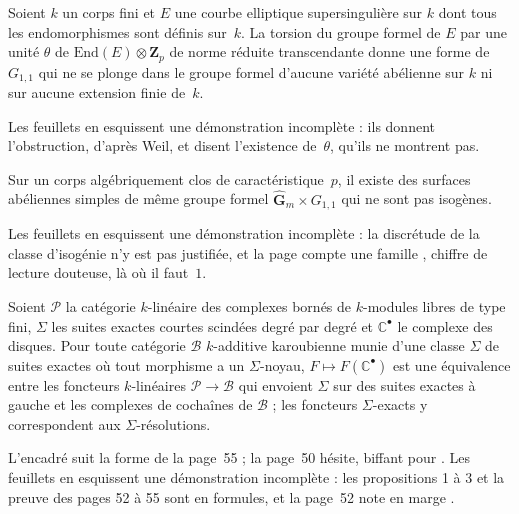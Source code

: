 \begin{encadre}
\begin{theoreme*}\nonverifie
Soient $k$ un corps fini et $E$ une courbe elliptique supersingulière sur $k$ dont tous les endomorphismes sont définis sur~$k$. La torsion du groupe formel de $E$ par une unité $\theta$ de $\mathrm{End}(E) \otimes \mathbf Z_p$ de norme réduite transcendante donne une forme de $G_{1,1}$ qui ne se plonge dans le groupe formel d'aucune variété abélienne sur $k$ ni sur aucune extension finie de~$k$.
\end{theoreme*}
\end{encadre}
{\small Les feuillets en esquissent une démonstration incomplète : ils donnent l'obstruction, d'après Weil, et disent  l'existence de~$\theta$, qu'ils ne montrent pas.\par}

\begin{encadre}
\begin{theoreme*}\nonverifie
Sur un corps algébriquement clos de caractéristique~$p$, il existe des surfaces abéliennes simples de même groupe formel $\hat{\mathbf G}_m \times G_{1,1}$ qui ne sont pas isogènes.
\end{theoreme*}
\end{encadre}
{\small Les feuillets en esquissent une démonstration incomplète : la discrétude de la classe d'isogénie n'y est pas justifiée, et la page compte une famille , chiffre de lecture douteuse, là où il faut~$1$.\par}

\begin{encadre}
\begin{theoreme*}\nonverifie
Soient $\mathcal P$ la catégorie $k$-linéaire des complexes bornés de $k$-modules libres de type fini, $\Sigma$ les suites exactes courtes scindées degré par degré et $\mathbb C^\bullet$ le complexe des disques. Pour toute catégorie $\mathcal B$ $k$-additive karoubienne munie d'une classe $\Sigma$ de suites exactes où tout morphisme a un $\Sigma$-noyau, $F \mapsto F(\mathbb C^\bullet)$ est une équivalence entre les foncteurs $k$-linéaires $\mathcal P \to \mathcal B$ qui envoient $\Sigma$ sur des suites exactes à gauche et les complexes de cochaînes de $\mathcal B$ ; les foncteurs $\Sigma$-exacts y correspondent aux $\Sigma$-résolutions.
\end{theoreme*}
\end{encadre}
{\small L'encadré suit la forme de la page~55 ; la page~50 hésite, biffant  pour . Les feuillets en esquissent une démonstration incomplète : les propositions 1 à 3 et la preuve des pages 52 à 55 sont en formules, et la page~52 note en marge .\par}

